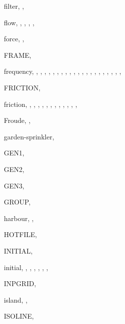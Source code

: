 \documentclass[12pt]{book}
\begin{document}
\begin{theindex}
  \item filter, , 
  \item flow, , , , 
		, 
  \item force, , 
  \item FRAME, 
  \item frequency, , , , 
		, , , 
		, , , 
		, , , 
		, , , 
		, , , 
		, , , 
  \item FRICTION, 
  \item friction, , , , 
		, , , 
		, , , 
		, , 
		, 
  \item Froude, , 

  \indexspace

  \item garden-sprinkler, 
  \item GEN1, 
  \item GEN2, 
  \item GEN3, 
  \item GROUP, 

  \indexspace

  \item harbour, , 
  \item HOTFILE, 

  \indexspace

  \item INITIAL, 
  \item initial, , , , 
		, , , 
  \item INPGRID, 
  \item island, , 
  \item ISOLINE, 


\end{theindex}
\end{document}
